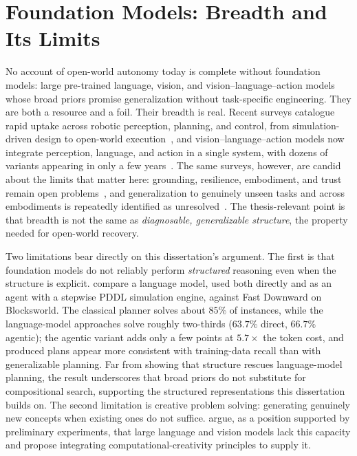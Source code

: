 
\section{Foundation Models: Breadth and Its Limits}
\label{sec:foundation_models}

No account of open-world autonomy today is complete without foundation models: large pre-trained language, vision, and vision--language--action models whose broad priors promise generalization without task-specific engineering. They are both a resource and a foil. Their breadth is real. Recent surveys catalogue rapid uptake across robotic perception, planning, and control, from simulation-driven design to open-world execution~\citep{khan2025foundation}, and vision--language--action models now integrate perception, language, and action in a single system, with dozens of variants appearing in only a few years~\citep{sapkota2025vla}. The same surveys, however, are candid about the limits that matter here: grounding, resilience, embodiment, and trust remain open problems~\citep{khan2025foundation}, and generalization to genuinely unseen tasks and across embodiments is repeatedly identified as unresolved~\citep{sapkota2025vla}. The thesis-relevant point is that breadth is not the same as \emph{diagnosable, generalizable structure}, the property needed for open-world recovery.

Two limitations bear directly on this dissertation's argument. The first is that foundation models do not reliably perform \emph{structured} reasoning even when the structure is explicit. \citet{gobel2026agentic} compare a language model, used both directly and as an agent with a stepwise PDDL simulation engine, against Fast Downward on Blocksworld. The classical planner solves about $85\%$ of instances, while the language-model approaches solve roughly two-thirds ($63.7\%$ direct, $66.7\%$ agentic); the agentic variant adds only a few points at $5.7\times$ the token cost, and produced plans appear more consistent with training-data recall than with generalizable planning. Far from showing that structure rescues language-model planning, the result underscores that broad priors do not substitute for compositional search, supporting the structured representations this dissertation builds on. The second limitation is creative problem solving: generating genuinely new concepts when existing ones do not suffice. \citet{nair2024cps} argue, as a position supported by preliminary experiments, that large language and vision models lack this capacity and propose integrating computational-creativity principles to supply it.


